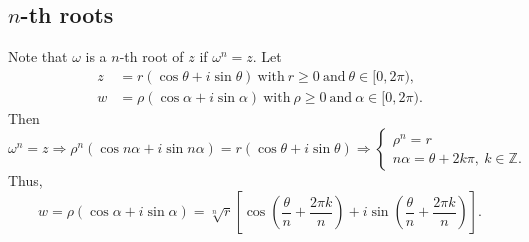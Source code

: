 \documentclass[12pt,openany]{book}
\theoremstyle{definition}
\newcommand{\Z}{\mathbb{Z}}
\newcommand{\of}[1]{\left( #1 \right)}
\begin{document}
	\subsection{$n$-th roots}
	Note that $\omega$ is a $n$-th root of $z$ if $\omega^n=z$. Let \begin{align*}
		z&=r\of{\cos\theta+i\sin\theta}\ \text{with}\ r\geq 0\ \text{and}\ \theta\in[0,2\pi),\\
		w&=\rho\of{\cos\alpha+i\sin\alpha}\ \text{with}\ \rho\geq 0\ \text{and}\ \alpha\in[0,2\pi).
	\end{align*} Then \[
	\omega^n=z\Rightarrow \rho^n(\cos n\alpha+i\sin n\alpha)=r\of{\cos\theta+i\sin\theta}\Rightarrow\begin{cases}
		\rho^n=r\\
		n\alpha=\theta+2k\pi,\ k\in\Z.
	\end{cases}
	\] Thus, \[
	w=\rho\of{\cos\alpha+i\sin\alpha}=\boxed{\sqrt[n]{r}\left[\cos\of{\frac{\theta}{n}+\frac{2\pi k}{n}}+i\sin\of{\frac{\theta}{n}+\frac{2\pi k}{n}}\right]}.
	\]
	\vspace{8pt}
\end{document}
